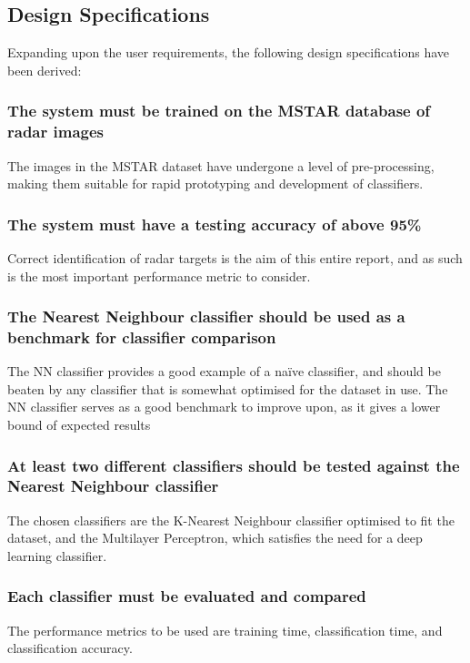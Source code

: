 \subsection{Design Specifications}
Expanding upon the user requirements, the following design specifications have been derived:

\subsubsection{The system must be trained on the MSTAR database of radar images}
The images in the MSTAR dataset have undergone a level of pre-processing, making them suitable for rapid prototyping and development of classifiers.

\subsubsection{The system must have a testing accuracy of above 95\%}
Correct identification of radar targets is the aim of this entire report, and as such is the most important performance metric to consider.

\subsubsection{The Nearest Neighbour classifier should be used as a benchmark for classifier comparison}
The NN classifier provides a good example of a na\"ive classifier, and should be beaten by any classifier that is somewhat optimised for the dataset in use. The NN classifier serves as a good benchmark to improve upon, as it gives a lower bound of expected results

\subsubsection{At least two different classifiers should be tested against the Nearest Neighbour classifier}
The chosen classifiers are the K-Nearest Neighbour classifier optimised to fit the dataset, and the Multilayer Perceptron, which satisfies the need for a deep learning classifier.

\subsubsection{Each classifier must be evaluated and compared}
The performance metrics to be used  are training time, classification time, and classification accuracy.

